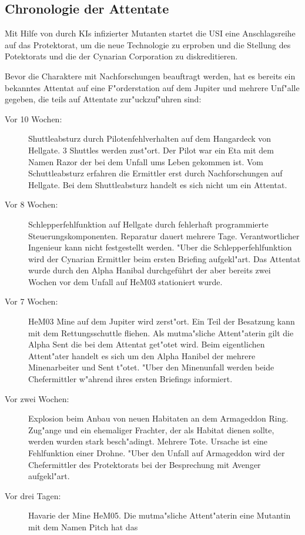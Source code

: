 \subsection{Chronologie der Attentate}

Mit Hilfe von durch KIs infizierter Mutanten startet die USI eine Anschlagsreihe auf das Protektorat, um die neue Technologie zu erproben und die Stellung des Potektorats und die der Cynarian Corporation zu diskreditieren.

Bevor die Charaktere mit Nachforschungen beauftragt werden, hat es bereits ein bekanntes Attentat auf eine F"orderstation auf dem Jupiter und mehrere Unf"alle gegeben, die teils auf Attentate zur"uckzuf"uhren sind:

\begin{description}
\item [Vor 10 Wochen:] Shuttleabsturz durch Pilotenfehlverhalten auf dem Hangardeck von Hellgate. 3 Shuttles
      werden zust"ort. Der Pilot war ein Eta mit dem Namen Razor der bei dem Unfall ums Leben gekommen ist. Vom Schuttleabsturz erfahren die Ermittler erst durch Nachforschungen auf Hellgate. Bei dem Shuttleabsturz handelt es sich nicht um ein Attentat.
\item [Vor 8 Wochen:] Schlepperfehlfunktion auf Hellgate durch fehlerhaft programmierte Steuerungskomponenten. Reparatur dauert
      mehrere Tage. Verantwortlicher Ingenieur kann nicht festgestellt werden. "Uber die Schlepperfehlfunktion wird der Cynarian Ermittler beim ersten Briefing aufgekl"art. Das Attentat wurde durch den Alpha Hanibal durchgeführt der aber bereits zwei Wochen vor dem Unfall auf HeM03 stationiert wurde.      
\item [Vor 7 Wochen:] HeM03 Mine auf dem Jupiter wird zerst"ort. Ein Teil der Besatzung kann mit dem
      Rettungsschuttle fliehen. Als mutma"sliche Attent"aterin gilt die Alpha Sent die bei dem Attentat get"otet wird. Beim eigentlichen Attent"ater handelt es sich um den Alpha Hanibel der mehrere Minenarbeiter und Sent t"otet. "Uber den Minenunfall werden beide Chefermittler w"ahrend ihres ersten Briefings informiert.
\item [Vor zwei Wochen:] Explosion beim Anbau von neuen Habitaten an dem Armageddon Ring. Zug"ange und ein
      ehemaliger Frachter, der als Habitat dienen sollte, werden wurden stark besch"adingt.  Mehrere Tote. Ursache ist eine Fehlfunktion einer Drohne. "Uber den Unfall auf Armageddon wird der Chefermittler des Protektorats bei der Besprechung mit Avenger aufgekl"art.
\item [Vor drei Tagen:] Havarie der Mine HeM05. Die mutma"sliche Attent"aterin eine Mutantin mit dem Namen Pitch hat das

\end{description}

